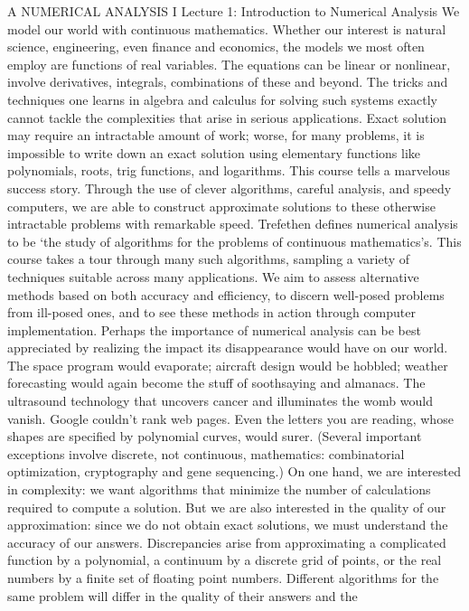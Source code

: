 \medskip
A NUMERICAL ANALYSIS I Lecture 1: Introduction to Numerical Analysis We model our world with continuous mathematics.
Whether our interest is natural science, engineering, even finance and economics, the models we most often employ are
functions of real variables. The equations can be linear or nonlinear, involve derivatives, integrals, combinations of
these and beyond. The tricks and techniques one learns in algebra and calculus for solving such systems exactly cannot
tackle the complexities that arise in serious applications. Exact solution may require an intractable amount of work;
worse, for many problems, it is impossible to write down an exact solution using elementary functions like polynomials,
roots, trig functions, and logarithms. This course tells a marvelous success story. Through the use of clever algorithms,
careful analysis, and speedy computers, we are able to construct approximate solutions to these otherwise intractable problems
with remarkable speed. Trefethen defines numerical analysis to be `the study of algorithms for the problems of continuous mathematics's.
This course takes a tour through many such algorithms, sampling a variety of techniques suitable across many applications. We aim to
assess alternative methods based on both accuracy and efficiency, to discern well-posed problems from ill-posed ones, and to see these
methods in action through computer implementation. Perhaps the importance of numerical analysis can be best appreciated by realizing the
impact its disappearance would have on our world. The space program would evaporate; aircraft design would be hobbled; weather forecasting
would again become the stuff of soothsaying and almanacs. The ultrasound technology that uncovers cancer and illuminates the womb would vanish.
Google couldn't rank web pages. Even the letters you are reading, whose shapes are specified by polynomial curves, would surer.
(Several important exceptions involve discrete, not continuous, mathematics: combinatorial optimization, cryptography and gene sequencing.)
On one hand, we are interested in complexity: we want algorithms that minimize the number of calculations required to compute a solution.
But we are also interested in the quality of our approximation: since we do not obtain exact solutions, we must understand the accuracy of our
answers. Discrepancies arise from approximating a complicated function by a polynomial, a continuum by a discrete grid of points, or the real
numbers by a finite set of floating point numbers. Different algorithms for the same problem will differ in the quality of their answers and the
